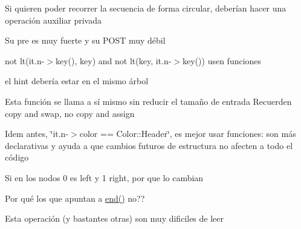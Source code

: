 \begin{DoxyRefList}
Si quieren poder recorrer la secuencia de forma circular, deberían hacer una operación auxiliar privada 
\item[\label{bug__bug000025}%
\hypertarget{bug__bug000025}{}%
Miembro \hyperlink{classaed2_1_1map_1_1iterator_ad052c1ef8477a1613c292202226053a5_ad052c1ef8477a1613c292202226053a5}{aed2\+:\+:map$<$ Key, Meaning, Compare $>$\+:\+:iterator\+:\+:operator==} (iterator other) const ]Su pre es muy fuerte y su P\+O\+ST muy débil 
\item[\label{bug__bug000011}%
\hypertarget{bug__bug000011}{}%
Miembro \hyperlink{classaed2_1_1map_a3399d36fdd5a880b494f3a5795d3f18f_a3399d36fdd5a880b494f3a5795d3f18f}{aed2\+:\+:map$<$ Key, Meaning, Compare $>$\+:\+:lower\+\_\+bound} (const Key \&key) const ]not lt(it.\+n-\/$>$key(), key) and not lt(key, it.\+n-\/$>$key()) usen funciones 
\item[\label{bug__bug000003}%
\hypertarget{bug__bug000003}{}%
Miembro \hyperlink{classaed2_1_1map_a7a77950a3d8e637bfa7cf5dcd904f257_a7a77950a3d8e637bfa7cf5dcd904f257}{aed2\+:\+:map$<$ Key, Meaning, Compare $>$\+:\+:map} (const map \&other)]el hint debería estar en el mismo árbol 
\item[\label{bug__bug000004}%
\hypertarget{bug__bug000004}{}%
Miembro \hyperlink{classaed2_1_1map_ac606d334809066929522964d45e76317_ac606d334809066929522964d45e76317}{aed2\+:\+:map$<$ Key, Meaning, Compare $>$\+:\+:operator=} (map other)]Esta función se llama a sí mismo sin reducir el tamaño de entrada Recuerden copy and swap, no copy and assign 
\item[\label{bug__bug000007}%
\hypertarget{bug__bug000007}{}%
Miembro \hyperlink{classaed2_1_1map_a96f23896164ab47bee48c26b803f9801_a96f23896164ab47bee48c26b803f9801}{aed2\+:\+:map$<$ Key, Meaning, Compare $>$\+:\+:operator\mbox{[}\mbox{]}} (const Key \&key)]Idem antes, \char`\"{}it.\+n-\/$>$color == Color\+::\+Header\char`\"{}, es mejor usar funciones\+: son más declarativas y ayuda a que cambios futuros de estructura no afecten a todo el código 
\item[\label{bug__bug000023}%
\hypertarget{bug__bug000023}{}%
Miembro \hyperlink{classaed2_1_1map_a54b1ea9f8c707232c744a4ac5c5302d2_a54b1ea9f8c707232c744a4ac5c5302d2}{aed2\+:\+:map$<$ Key, Meaning, Compare $>$\+:\+:Rotate} (\hyperlink{structaed2_1_1map_1_1Node}{Node} $\ast$n, int i)]Si en los nodos 0 es left y 1 right, por que lo cambian 
\item[\label{bug__bug000005}%
\hypertarget{bug__bug000005}{}%
Miembro \hyperlink{classaed2_1_1map_ab22c9a85c2dadbc286cd30e97069a8e6_ab22c9a85c2dadbc286cd30e97069a8e6}{aed2\+:\+:map$<$ Key, Meaning, Compare $>$\+:\+:$\sim$map} ()]Por qué los que apuntan a \hyperlink{classaed2_1_1map_a76023e6a56cb625513e1b5ea028bf983_a76023e6a56cb625513e1b5ea028bf983}{end()} no?? 
\item[\label{bug__bug000001}%
\hypertarget{bug__bug000001}{}%
Página \hyperlink{axiomas}{Axiomas y proposiciones auxiliares} ]Esta operación (y bastantes otras) son muy dificiles de leer 


\end{DoxyRefList}
